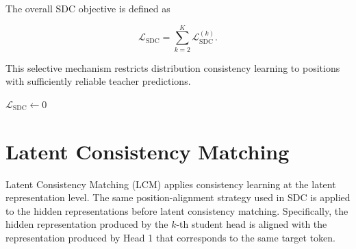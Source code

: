The overall SDC objective is defined as

\begin{equation}
    \mathcal{L}_{\mathrm{SDC}}=\sum_{k=2}^{K}\mathcal{L}_{\mathrm{SDC}}^{(k)}.
\end{equation}

This selective mechanism restricts distribution consistency learning to positions with sufficiently reliable teacher predictions.

\begin{algorithm}[htbp]
\caption{Selective Distribution Consistency}
\label{alg:sdc}



$\mathcal{L}_{\mathrm{SDC}} \leftarrow 0$\;



\;

\end{algorithm}

\section{Latent Consistency Matching}\label{sec:3-latent_consistency_matching}
Latent Consistency Matching (LCM) applies consistency learning at the latent representation level. The same position-alignment strategy used in SDC is applied to the hidden representations before latent consistency matching. Specifically, the hidden representation produced by the $k$-th student head is aligned with the representation produced by Head 1 that corresponds to the same target token.

